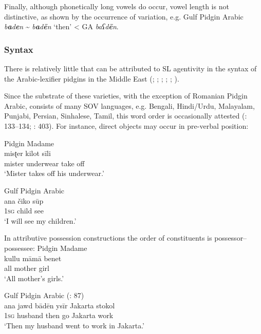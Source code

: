 \documentclass[output=paper]{langsci/langscibook}
\begin{document}
Finally, although phonetically long vowels do occur, vowel length is not distinctive, as shown by the occurrence of variation, e.g. Gulf Pidgin Arabic \textit{b\textbf{a}d\textbf{e}n} {\textasciitilde} \textit{b\textbf{a}d\textbf{ē}n} ‘then’ < GA \textit{baʕd\textbf{ē}n}. 


 \subsubsection{Syntax} 

There is relatively little that can be attributed to SL agentivity in the syntax of the Arabic-lexifier pidgins in the Middle East (\citealt{Almoaily2013}; \citealt{Al-Salman2013}; \citealt{Avram2014Pidgin}; \citealt{Bizri2014}; \citealt{Avram2017article}; \citealt{Bakir2017}).

Since the substrate of these varieties, with the exception of Romanian Pidgin Arabic, consists of many SOV languages, e.g. Bengali, Hindi/Urdu, Malayalam, Punjabi, Persian, Sinhalese, Tamil, this word order is occasionally attested (\citealt{Avram2017article}: 133–134; \citealt{Bizri2014}: 403). For instance, direct objects may occur in pre-verbal position:                                                              


\ea
\ea Pidgin Madame \citep[227]{Bizri2010}\\
\gll     misʈer kilot sīli\\
         mister underwear take off\\
\glt       `Mister takes off his underwear.'     

\ex Gulf Pidgin Arabic \citep[133]{Avram2017article}\\
\gll     ana čiko sūp\\
         1\textsc{sg} child see\\
\glt       `I will see my children.'                                        
\z                                             
\z

In attributive possession constructions the order of constituents is possessor–possessee:                                                                                        
\ea\label{ex:key:}
\ea Pidgin Madame \citep[198]{Bizri2010} \\
\gll     kullu māmā benet \\
         all mother girl    \\
\glt `All mother’s girls.'

\ex Gulf Pidgin Arabic (\citealt{Næss2008}: 87)\\
\gll     ana jawd bādēn ysīr Jakarta stokol\\
         1\textsc{sg} husband then go Jakarta work\\
\glt       `Then my husband went to work in Jakarta.' 
\z
\z
\end{document}
